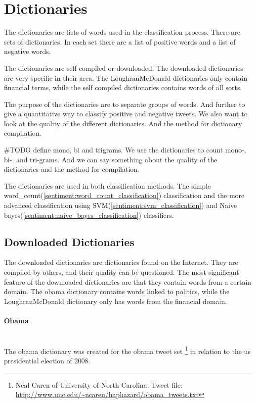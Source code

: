 \section{Dictionaries}\label{data:dictionaries}

The dictionaries are lists of words used in the classification process. There
are sets of dictionaries. In each set there are a list of positive words and a list of negative words. 

The dictionaries are self compiled or downloaded. The downloaded dictionaries
are very specific in their area. The LoughranMcDonald dictionaries only contain
financial terms, while the self compiled dictionaries contains words of all
sorts. 

The purpose of the dictionaries are to separate groups of words. And
further to give a quantitative way to classify positive and negative tweets.
We also want to look at the quality of the different dictionaries. And the
method for dictionary compilation.  

#TODO define mono, bi and trigrams. 
We use the dictionaries to count mono-, bi-, and tri-grams.
And we can say something about the quality of the dictionaries and the method
for compilation.

The dictionaries are used in both classification methods. The simple
word\_count(\ref{sentiment:word_count_classification}) classification and the
more advanced classification using SVM(\ref{sentiment:svm_classification}) and
Naive bayes(\ref{sentiment:naive_bayes_classification}) classifiers. 
%

\subsection{Downloaded Dictionaries}
The downloaded dictionaries are dictionaries found on the Internet. They are
compiled by others, and their quality can be questioned. The most significant
feature of the downloaded dictionaries are that they contain words from a
certain domain. The obama dictionary contains words linked to politics,
while the LoughranMcDonald dictionary only has words from the financial domain.  

\paragraph{Obama}
\hspace{0pt}\\
The obama dictionary was created for the obama tweet set
\footnote{Neal Caren of University of North Carolina. Tweet file:
\url{http://www.unc.edu/~ncaren/haphazard/obama_tweets.txt}} in relation to the
us presidential election of 2008.

